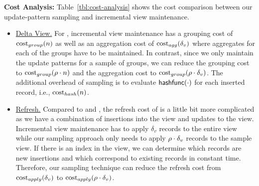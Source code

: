 \vspace{.5em}
{\noindent \bf Cost Analysis: }
 Table~\ref{tbl:cost-analysis} shows the cost comparison between our update-pattern sampling and incremental view maintenance.
\vspace{-0.5em}
\begin{itemize}
\item \underline{Delta View.} For \aggview, incremental view maintenance has a grouping cost of $\textrm{cost}_{group}(n)$ as well as an aggregation cost of $\textrm{cost}_{agg}(\delta_v)$ where aggregates for each of the groups have to be maintained. In contrast, since we only maintain the update patterns for a sample of groups, we can reduce the grouping cost to $\textrm{cost}_{group}(\rho  \cdot n)$ and the aggregation cost to $\textrm{cost}_{group}(\rho  \cdot \delta_v)$. The additional overhead of sampling is to evaluate $\textsf{hashfunc}(\cdot)$ for each inserted record, i.e., $\textrm{cost}_{hash}(n)$.  \vspace{-0.5em}
\item \underline{Refresh.} Compared to \spview and \fjview, the refresh cost of \aggview is a little bit more complicated as we have a combination of insertions into the view and updates to the view. 
Incremental view maintenance has to apply $\delta_v$ records to the entire view while our sampling approach only needs to apply $\rho  \cdot \delta_v$ records to the sample view. 
If there is an index in the view, we can 
determine which records are new insertions and which correspond to existing records in constant time. Therefore, our sampling technique can reduce the refresh cost from $\textrm{cost}_{apply}(\delta_v)$ to $\textrm{cost}_{apply}(\rho \cdot \delta_v)$.

\vspace{-0.25em}

\end{itemize}

